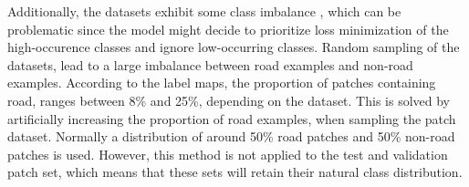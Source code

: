 Additionally, the datasets exhibit some class imbalance \citep{Japkowicz_class_imbalance}, which can be problematic since the model might decide to prioritize loss minimization of the high-occurence classes and ignore low-occurring classes. Random sampling of the datasets, lead to a large imbalance between road examples and non-road examples. According to the label maps, the proportion of patches containing road, ranges between 8\% and 25\%, depending on the dataset. This is solved by artificially increasing the proportion of road examples, when sampling the patch dataset. Normally a distribution of around 50\% road patches and 50\% non-road patches is used. However, this method is not applied to the test and validation patch set, which means that these sets will retain their natural class distribution.\\

